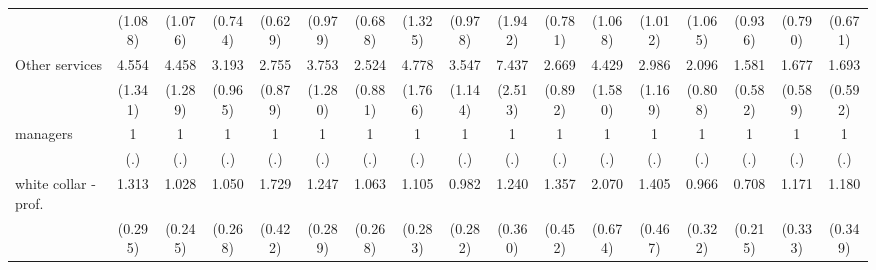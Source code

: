 {\begin{tabular}{l*{16}{c}}
                    &     (1.088)         &     (1.076)         &     (0.744)         &     (0.629)         &     (0.979)         &     (0.688)         &     (1.325)         &     (0.978)         &     (1.942)         &     (0.781)         &     (1.068)         &     (1.012)         &     (1.065)         &     (0.936)         &     (0.790)         &     (0.671)         \\
[1em]
Other services      &       4.554\sym{***}&       4.458\sym{***}&       3.193\sym{***}&       2.755\sym{**} &       3.753\sym{***}&       2.524\sym{**} &       4.778\sym{***}&       3.547\sym{***}&       7.437\sym{***}&       2.669\sym{**} &       4.429\sym{***}&       2.986\sym{**} &       2.096         &       1.581         &       1.677         &       1.693         \\
                    &     (1.341)         &     (1.289)         &     (0.965)         &     (0.879)         &     (1.280)         &     (0.881)         &     (1.766)         &     (1.144)         &     (2.513)         &     (0.892)         &     (1.580)         &     (1.169)         &     (0.808)         &     (0.582)         &     (0.589)         &     (0.592)         \\
[1em]
managers            &           1         &           1         &           1         &           1         &           1         &           1         &           1         &           1         &           1         &           1         &           1         &           1         &           1         &           1         &           1         &           1         \\
                    &         (.)         &         (.)         &         (.)         &         (.)         &         (.)         &         (.)         &         (.)         &         (.)         &         (.)         &         (.)         &         (.)         &         (.)         &         (.)         &         (.)         &         (.)         &         (.)         \\
[1em]
white collar - prof.&       1.313         &       1.028         &       1.050         &       1.729\sym{*}  &       1.247         &       1.063         &       1.105         &       0.982         &       1.240         &       1.357         &       2.070\sym{*}  &       1.405         &       0.966         &       0.708         &       1.171         &       1.180         \\
                    &     (0.295)         &     (0.245)         &     (0.268)         &     (0.422)         &     (0.289)         &     (0.268)         &     (0.283)         &     (0.282)         &     (0.360)         &     (0.452)         &     (0.674)         &     (0.467)         &     (0.322)         &     (0.215)         &     (0.333)         &     (0.349)         \\

\end{tabular}}
